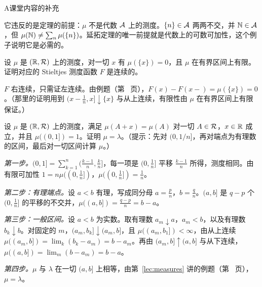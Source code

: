 \begin{exercises}{A}{课堂内容的补充}
\begin{solution}
它违反的是定理的前提：$\mu$ 不是代数 $\mathcal{A}$ 上的测度。$\{n\}\in\mathcal{A}$ 两两不交，并 $\mathbb{N}\in\mathcal{A}$，但 $\mu(\mathbb{N})\neq\sum_n\mu(\{n\})$。延拓定理的唯一前提就是代数上的可数可加性，这个例子说明它是必需的。
\end{solution}

\item\label{ex:extension:A9} 设 $\mu$ 是 $(\mathbb{R},\mathcal{R})$ 上的测度，对一切 $x$ 有 $\mu(\{x\})=0$，且 $\mu$ 在有界区间上有限。证明对应的 Stieltjes 测度函数 $F$ 是连续的。
\begin{solution}
$F$ 右连续，只需证左连续。由例题（第~\pageref{we:extension:atoms} 页），$F(x)-F(x-)=\mu(\{x\})=0$。（那里的证明用到 $(x-\frac1n,x]\downarrow\{x\}$ 与从上连续，有限性由 $\mu$ 在有界区间上有限保证。）
\end{solution}

\item\label{ex:extension:A10} 设 $\mu$ 是 $(\mathbb{R},\mathcal{R})$ 上的测度，满足 $\mu(A+x)=\mu(A)$ 对一切 $A\in\mathcal{R}$，$x\in\mathbb{R}$ 成立，并且 $\mu((0,1])=1$。证明 $\mu=\lambda$。（提示：先对 $(0,1/n]$，再对端点为有理数的区间，最后对一切区间计算 $\mu$。）
\begin{solution}
\emph{第一步。}$(0,1]=\sum_{k=1}^n(\frac{k-1}n,\frac kn]$，每一项是 $(0,\frac1n]$ 平移 $\frac{k-1}n$ 所得，测度相同。由有限可加性 $1=n\mu((0,\frac1n])$，$\mu((0,\frac1n])=\frac1n$。

\emph{第二步：有理端点。}设 $a<b$ 有理，写成同分母 $a=\frac pn$，$b=\frac qn$。$(a,b]$ 是 $q-p$ 个 $(0,\frac1n]$ 的平移的不交并，$\mu((a,b])=\frac{q-p}n=b-a$。

\emph{第三步：一般区间。}设 $a<b$ 为实数。取有理数 $a_m\downarrow a$，$a_m<b$，以及有理数 $b_k\downarrow b$。对固定的 $m$，$(a_m,b_k]\downarrow(a_m,b]$，且 $\mu((a_m,b_1])<\infty$，由从上连续 $\mu((a_m,b])=\lim_k(b_k-a_m)=b-a_m$。再由 $(a_m,b]\uparrow(a,b]$ 与从下连续，$\mu((a,b])=\lim_m(b-a_m)=b-a$。

\emph{第四步。}$\mu$ 与 $\lambda$ 在一切 $(a,b]$ 上相等，由第~\ref{lec:measures} 讲的例题（第~\pageref{we:measures:uniqueness-lebesgue} 页），$\mu=\lambda$。
\end{solution}
\end{exercises}


